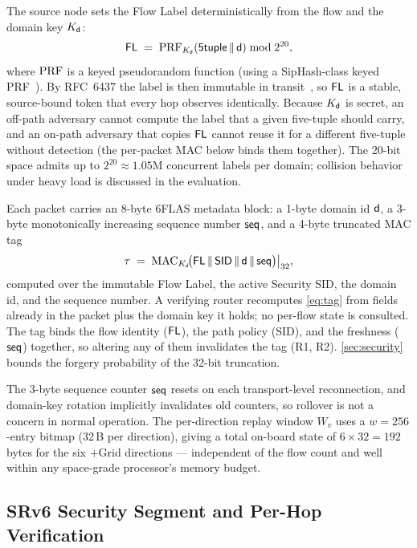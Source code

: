 The source node sets the Flow Label deterministically from the flow and the
domain key $K_{\mathsf{d}}$:
\begin{equation}
\label{eq:fl}
\mathsf{FL} \;=\; \operatorname{PRF}_{K_{\mathsf{d}}}(\textsf{5tuple}\,\|\,\mathsf{d}) \bmod 2^{20},
\end{equation}
where $\operatorname{PRF}$ is a keyed pseudorandom function (using a SipHash-class keyed
PRF~\cite{siphash}). By RFC~6437 the label is then immutable in
transit~\cite{rfc6437}, so $\mathsf{FL}$ is a stable, source-bound token that every hop
observes identically. Because $K_{\mathsf{d}}$ is secret, an off-path adversary
cannot compute the label that a given five-tuple should carry, and an on-path
adversary that copies $\mathsf{FL}$ cannot reuse it for a different five-tuple without
detection (the per-packet MAC below binds them together). The 20-bit space
admits up to $2^{20}\approx 1.05$M concurrent labels per domain; collision
behavior under heavy load is discussed in the evaluation.

Each packet carries an 8-byte 6FLAS metadata block: a 1-byte domain id $\mathsf{d}$,
a 3-byte monotonically increasing sequence number $\mathsf{seq}$, and a 4-byte
truncated MAC tag
\begin{equation}
\label{eq:tag}
\tau \;=\; \operatorname{MAC}_{K_{\mathsf{d}}}\!\bigl(\mathsf{FL} \,\|\, \textsf{SID} \,\|\, \mathsf{d} \,\|\, \mathsf{seq}\bigr)\big|_{32},
\end{equation}
computed over the immutable Flow Label, the active Security SID, the domain id,
and the sequence number. A verifying router recomputes \cref{eq:tag} from
fields already in the packet plus the domain key it holds; no per-flow state is
consulted. The tag binds the flow identity ($\mathsf{FL}$), the path policy
(\textsf{SID}), and the freshness ($\mathsf{seq}$) together, so altering any of them
invalidates the tag (R1, R2). \cref{sec:security} bounds the forgery
probability of the 32-bit truncation.

The 3-byte sequence counter $\mathsf{seq}$ resets on each transport-level reconnection,
and domain-key rotation implicitly invalidates old counters, so rollover is not
a concern in normal operation. The per-direction replay window $W_v$ uses a
$w=256$-entry bitmap (32\,B per direction), giving a total on-board state of
$6\times32=192$\,bytes for the six $+$Grid directions — independent of the flow
count and well within any space-grade processor's memory budget.

\subsection{SRv6 Security Segment and Per-Hop Verification}
\label{sec:srv6-bind}

